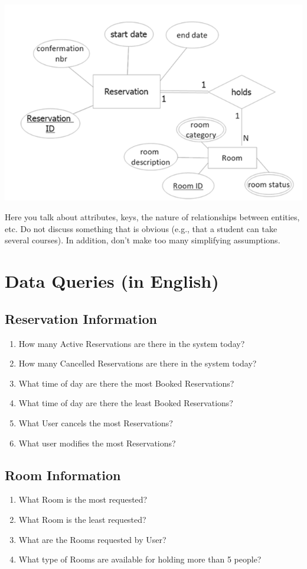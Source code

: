 \documentclass[11pt]{report}
\begin{document}
 
\begin{center}
\includegraphics{resv_holds_room.PNG}
\end{center}
 
 
 
 
 

Here you talk about attributes,
 keys, the nature of relationships between entities, etc. Do not 
discuss something that is obvious (e.g.,
 that a student can take several courses). In addition,
don't make too many simplifying assumptions.


\section*{Data Queries (in English)}
\subsection*{Reservation Information}
\begin{enumerate}
\item How many Active Reservations are there in the system today?
\item How many Cancelled Reservations are there in the system today?
\item What time of day are there the most Booked Reservations?
\item What time of day are there the least Booked Reservations?
\item What User cancels the most Reservations?
\item What user modifies the most Reservations?
\end{enumerate}

\subsection*{Room Information}
\begin{enumerate}
\item What Room is the most requested?
\item What Room is the least requested?
\item What are the Rooms requested by User?
\item What type of Rooms are available for holding more than 5 people?
\end{enumerate}
\end{document}
